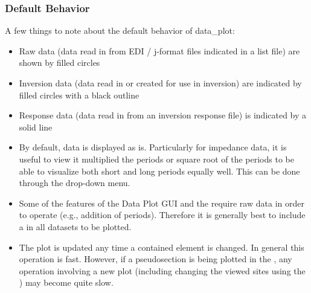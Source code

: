 \documentclass[letterpaper,10pt,english]{sphinxmanual}
\begin{document}
\subsubsection{Default Behavior}
\label{\detokenize{content/data_plot/getting_started:default-behavior}}
A few things to note about the default behavior of data\_plot:
\begin{itemize}
\item {} 
Raw data (data read in from EDI / j-format files indicated in a list file) are shown by filled circles

\item {} 
Inversion data (data read in or created for use in inversion) are indicated by filled circles with a black outline

\item {} 
Response data (data read in from an inversion response file) is indicated by a solid line

\item {} 
By default, data is displayed as is. Particularly for impedance data, it is useful to view it multiplied the periods or square root of the periods to be able to visualize both short and long periods equally well. This can be done through the {\hyperref[\detokenize{content/data_plot/main_window:scaling}]{}} drop-down menu.

\item {} 
Some of the features of the Data Plot GUI and the {\hyperref[\detokenize{content/data_plot/map_viewer:map-viewer}]{}} require raw data in order to operate (e.g., addition of periods). Therefore it is generally best to include a {\hyperref[\detokenize{content/api_core/input_files:list-file}]{}} in all datasets to be plotted.

\item {} 
The {\hyperref[\detokenize{content/data_plot/map_viewer:map-viewer}]{}} plot is updated any time a contained element is changed. In general this operation is fast. However, if a pseudosection is being plotted in the {\hyperref[\detokenize{content/data_plot/map_viewer:map-window}]{}}, any operation involving a new plot (including changing the viewed sites using the {\hyperref[\detokenize{content/data_plot/main_window:forward-and-back-buttons}]{}}) may become quite slow.


\end{itemize}
\end{document}
